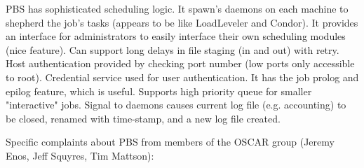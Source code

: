 PBS has sophisticated scheduling logic. It spawn's daemons on each 
machine to shepherd the job's tasks (appears to be like LoadLeveler 
and Condor). It provides an interface for administrators to easily 
interface their own scheduling modules (nice feature).  Can support 
long delays in file staging (in and out) with retry.  Host 
authentication provided by checking port number (low ports only 
accessible to root).  Credential service used for user authentication. 
It has the job prolog and epilog feature, which is useful.  Supports 
high priority queue for smaller "interactive" jobs.  Signal to daemons 
causes current log file (e.g. accounting) to be closed, renamed with 
time-stamp, and a new log file created.

Specific complaints about PBS from members of the OSCAR group (Jeremy Enos, 
Jeff Squyres, Tim Mattson):
